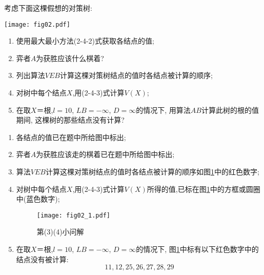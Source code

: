 
\begin{problem}[习题2.8]
考虑下面这棵假想的对策树:
\begin{center}
\texttt{[image: fig02.pdf]}\\
\end{center}
\begin{enumerate}
\item 使用最大最小方法(2-4-2)式获取各结点的值;
\item 弈者$A$为获胜应该什么棋着?
\item 列出算法$VEB$计算这棵对策树结点的值时各结点被计算的顺序;
\item 对树中每个结点$X$,用(2-4-3)式计算$V(X)$;
\item 在取$X＝\textrm{根}$,$l=10$, $LB=-\infty$, $D=\infty$的情况下, 用算法$AB$计算此树的根的值期间, 这棵树的那些结点没有计算?
\end{enumerate}
\end{problem}
\begin{solution}
\begin{enumerate}
\item 各结点的值已在题中所给图中标出;
\item 弈者$A$为获胜应该走的棋着已在题中所给图中标出;
\item 算法$VEB$计算这棵对策树结点的值时各结点被计算的顺序如图\ref{ans34}中的红色数字;
\item 对树中每个结点$X$,用(2-4-3)式计算$V(X)$所得的值,已标在图\ref{ans34}中的方框或圆圈中(蓝色数字);
\begin{figure}[!htb]
\centering
\texttt{[image: fig02\_1.pdf]}
\caption{\label{ans34}第(3)(4)小问解}
\end{figure}
\item 在取$X＝\textrm{根}$,$l=10$, $LB=-\infty$, $D=\infty$的情况下, 图\ref{ans34}中标有以下红色数字中的结点没有被计算:
    \[
    11, 12, 25, 26, 27, 28, 29
    \]
\end{enumerate}
\end{solution}
